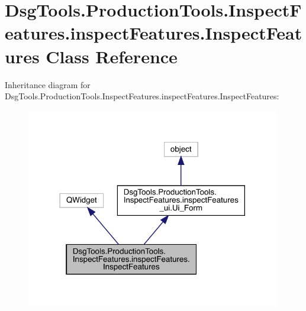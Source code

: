 \hypertarget{class_dsg_tools_1_1_production_tools_1_1_inspect_features_1_1inspect_features_1_1_inspect_features}{}\section{Dsg\+Tools.\+Production\+Tools.\+Inspect\+Features.\+inspect\+Features.\+Inspect\+Features Class Reference}
\label{class_dsg_tools_1_1_production_tools_1_1_inspect_features_1_1inspect_features_1_1_inspect_features}


Inheritance diagram for Dsg\+Tools.\+Production\+Tools.\+Inspect\+Features.\+inspect\+Features.\+Inspect\+Features\+:
\nopagebreak
\begin{figure}[H]
\begin{center}
\leavevmode
\includegraphics[width=314pt]{class_dsg_tools_1_1_production_tools_1_1_inspect_features_1_1inspect_features_1_1_inspect_features__inherit__graph}
\end{center}
\end{figure}


